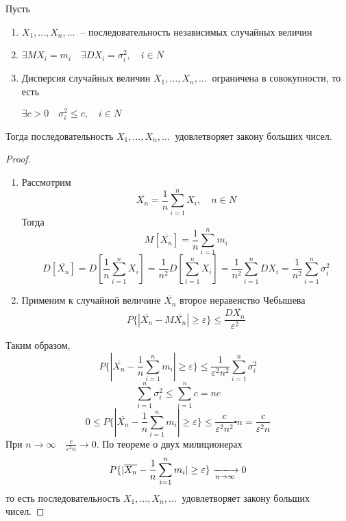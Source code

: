\documentclass[a4paper, 12pt]{article}
\theoremstyle{definition}
\theoremstyle{leads}
\theoremstyle{example}
\newcommand{\infseq}[3]{%
	\ensuremath{#1_#2, \dots, #1_#3, \dots}\ }
\newcommand{\infseqX}{%
	\infseq{X}{1}{n}}
\begin{document}
\begin{bcheb}
	Пусть 
	\begin{enumerate}
		\item $\infseqX$ -- последовательность независимых случайных величин
		\item $\exists MX_i = m_i \quad \exists DX_i = \sigma_i^2, \quad i \in N$
		\item Дисперсия случайных величин $\infseqX$ ограничена в совокупности, то есть
		\begin{center}
			\centering
			$\exists c > 0 \quad \sigma_i^2 \leq c, \quad i \in N$
		\end{center}
	\end{enumerate}
Тогда последовательность $\infseqX$ удовлетворяет закону больших чисел.
\end{bcheb}
\begin{proof}
	\begin{enumerate}
		\item Рассмотрим 
		\begin{displaymath}
		\overline{X_n} = \frac{1}{n} \sum_{i = 1}^{n}X_i,\quad n \in N
		\end{displaymath}
		Тогда
		\begin{displaymath}
			M[\overline{X_n}] = \frac{1}{n} \sum_{i=1}^{n} m_i
		\end{displaymath}
		\begin{displaymath}
			D[\overline{X_n}] = D[\frac{1}{n} \sum_{i=1}^{n} X_i] = \frac{1}{n^2} D[\sum_{i = 1}^{n}X_i] = \frac{1}{n^2}\sum_{i=1}^{n}DX_i = \frac{1}{n^2} \sum_{i = 1}^{n}\sigma_i^2
		\end{displaymath}
		\item Применим к случайной величине $\overline{X_n}$ второе неравенство Чебышева
		\begin{displaymath} 
			P\{|\overline{X_n} - M\overline{X_n}| \geq \varepsilon\} \leq \frac{D\overline{X_n}}{\varepsilon^2}
		\end{displaymath}
	\end{enumerate}
Таким образом, 
\begin{displaymath}
P\{|\overline{X_n} - \frac{1}{n}\sum_{i=1}^{n} m_i|\geq \varepsilon\} \leq \frac{1}{\varepsilon^2 n^2}\sum_{i=1}^{n} \sigma_i^2
\end{displaymath}
\begin{displaymath}
	\sum_{i=1}^{n} \sigma_i^2 \leq \sum_{i=1}^{n} c = nc
\end{displaymath}
\begin{displaymath}
	0 \leq P\{|\overline{X_n} - \frac{1}{n} \sum_{i=1}^{n} m_i| \geq \varepsilon\} \leq \frac{c}{\varepsilon^2 n^2} \centerdot n = \frac{c}{\varepsilon^2 n}
\end{displaymath}
При $n\rightarrow \infty \quad \frac{c}{\varepsilon^2 n} \rightarrow 0$.
По теореме о двух милиционерах
\begin{displaymath}
	P\{|\overline{X_n} - \frac{1}{n}\sum_{i = 1}^{n}m_i| \geq \varepsilon\} \xlongrightarrow[n\rightarrow \infty]{} 0
\end{displaymath}
то есть последовательность $\infseqX$ удовлетворяет закону больших чисел.
\end{proof}
\end{document}
